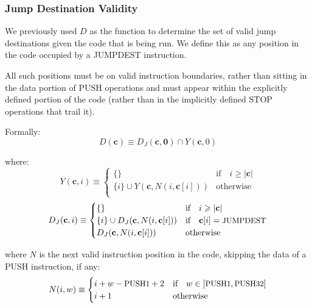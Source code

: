 \documentclass[9pt,oneside]{amsart}
\begin{document}
\begin{multicols}{2}
\subsubsection{Jump Destination Validity}

We previously used $D$ as the function to determine the set of valid jump destinations given the code that is being run. We define this as any position in the code occupied by a {\small JUMPDEST} instruction.

All such positions must be on valid instruction boundaries, rather than sitting in the data portion of {\small PUSH} operations and must appear within the explicitly defined portion of the code (rather than in the implicitly defined {\small STOP} operations that trail it).

Formally:
\begin{equation}
D(\mathbf{c}) \equiv D_J(\mathbf{c, 0}) \cap Y(\mathbf{c}, 0)
\end{equation}

where:
\begin{equation}
Y(\mathbf{c}, i) \equiv \begin{cases}
\{\} & \text{if} \quad i \geqslant |\mathbf{c}| \\
\{ i \} \cup Y(\mathbf{c}, N(i, \mathbf{c}[i])) & \text{otherwise} \\
\end{cases}
\end{equation}
\begin{equation}
D_J(\mathbf{c}, i) \equiv \begin{cases}
\{\} & \text{if} \quad i \geqslant |\mathbf{c}|  \\
\{ i \} \cup D_J(\mathbf{c}, N(i, \mathbf{c}[i])) & \text{if} \quad \mathbf{c}[i] = \text{\small JUMPDEST} \\
D_J(\mathbf{c}, N(i, \mathbf{c}[i])) & \text{otherwise} \\
\end{cases}
\end{equation}

where $N$ is the next valid instruction position in the code, skipping the data of a {\small PUSH} instruction, if any:
\begin{equation}
N(i, w) \equiv \begin{cases}
i + w - \text{\small PUSH1} + 2 & \text{if} \quad w \in [\text{\small PUSH1}, \text{\small PUSH32}] \\
i + 1 & \text{otherwise} \end{cases}
\end{equation}


\end{multicols}
\end{document}
